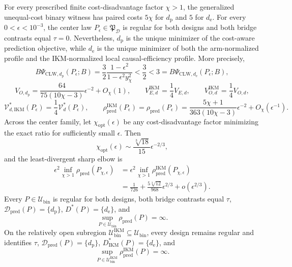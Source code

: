 For every prescribed finite cost-disadvantage factor \(\chi>1\), the generalized unequal-cost binary witness has paired costs \(5\chi\) for \(d_{\mathrm p}\) and \(5\) for \(d_{\mathrm e}\). For every \(0<\epsilon<10^{-3}\), the center law \(P_\epsilon\in\mathfrak P_{\mathcal D}\) is regular for both designs and both bridge contrasts equal \(\tau=0\). Nevertheless, \(d_{\mathrm p}\) is the unique minimizer of the cost-aware prediction objective, while \(d_{\mathrm e}\) is the unique minimizer of both the arm-normalized profile and the IKM-normalized local causal-efficiency profile. More precisely,
\[
 B\Psi_{\mathrm{CLW},d_{\mathrm p}}(P_\epsilon;B)
 =\frac32\frac{1-\epsilon^2}{1-\epsilon^2y_\chi^2}
 <\frac32<3
 =B\Psi_{\mathrm{CLW},d_{\mathrm e}}(P_\epsilon;B),
\]
\[
 V_{O,d_{\mathrm p}}
 =\frac{64}{75(10\chi-3)}\epsilon^{-2}+O_\chi(1),
 \qquad
 V_{E,d}^{\mathrm{IKM}}=\frac14V_{E,d},
 \qquad
 V_{O,d}^{\mathrm{IKM}}=\frac14V_{O,d},
\]
\[
 \mathcal V_{d,\mathrm{IKM}}^*(P_\epsilon)
 =\frac14\mathcal V_d^*(P_\epsilon),
 \qquad
 \rho_{\mathrm{pred}}^{\mathrm{IKM}}(P_\epsilon)
 =\rho_{\mathrm{pred}}(P_\epsilon)
 =\frac{5\chi+1}{363(10\chi-3)}\epsilon^{-2}
 +O_\chi(\epsilon^{-1}).
\]
Across the center family, let \(\chi_{\mathrm{opt}}(\epsilon)\) be any cost-disadvantage factor minimizing the exact ratio for sufficiently small \(\epsilon\). Then
\[
 \chi_{\mathrm{opt}}(\epsilon)
 \sim \frac{\sqrt[3]{18}}{15}\epsilon^{-2/3},
\]
and the least-divergent sharp elbow is
\[
\begin{aligned}
 \epsilon^2\inf_{\chi>1}\rho_{\mathrm{pred}}(P_{\chi,\epsilon})
 &=\epsilon^2\inf_{\chi>1}\rho_{\mathrm{pred}}^{\mathrm{IKM}}(P_{\chi,\epsilon})\\
 &=\frac1{726}+\frac{5\sqrt[3]{12}}{968}\epsilon^{2/3}
 +o(\epsilon^{2/3}).
\end{aligned}
\]
Every \(P\in\mathcal U_{\mathrm{bin}}\) is regular for both designs, both bridge contrasts equal \(\tau\), \(\mathcal D_{\mathrm{pred}}(P)=\{d_{\mathrm p}\}\), \(D^*(P)=\{d_{\mathrm e}\}\), and
\[
 \sup_{P\in\mathcal U_{\mathrm{bin}}}\rho_{\mathrm{pred}}(P)=\infty.
\]
On the relatively open subregion \(\mathcal U_{\mathrm{bin}}^{\mathrm{IKM}}\subseteq\mathcal U_{\mathrm{bin}}\), every design remains regular and identifies \(\tau\), \(\mathcal D_{\mathrm{pred}}(P)=\{d_{\mathrm p}\}\), \(D_{\mathrm{IKM}}^*(P)=\{d_{\mathrm e}\}\), and
\[
 \sup_{P\in\mathcal U_{\mathrm{bin}}^{\mathrm{IKM}}}
 \rho_{\mathrm{pred}}^{\mathrm{IKM}}(P)=\infty.
\]
